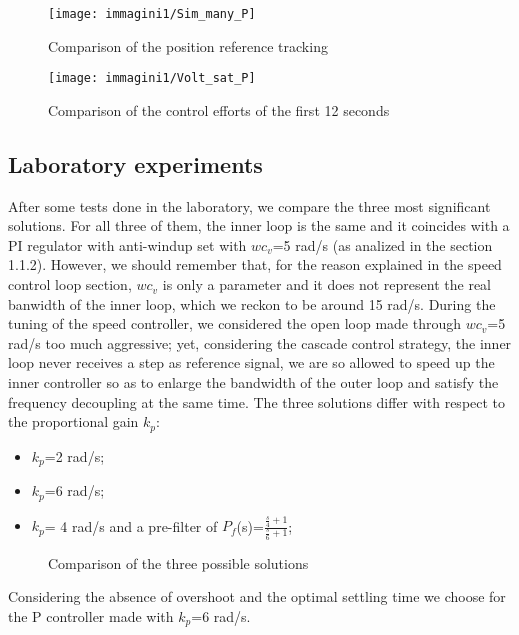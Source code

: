 \begin{figure}[h]
	\centering
	\texttt{[image: immagini1/Sim\_many\_P]}
	\caption{Comparison of the position reference tracking}
	\label{fig:Pos_ref_comparison}
\end{figure}
\begin{figure}[h]
	\centering
	\texttt{[image: immagini1/Volt\_sat\_P]}
	\caption{Comparison of the control efforts of the first 12 seconds}
	\label{fig:Volt_sat_comparison}
\end{figure}

\subsection{Laboratory experiments}
After some tests done in the laboratory, we compare the three most significant solutions. For all three of them, the inner loop is the same and it coincides with a PI regulator with anti-windup set with $wc_{v}$=5 rad/s (as analized in the section 1.1.2). However, we should remember that, for the reason explained in the speed control loop section, $wc_{v}$ is only a parameter and it does not represent the real banwidth of the inner loop, which we reckon to be around 15 rad/s.
During the tuning of the speed controller, we considered the open loop made through $wc_{v}$=5 rad/s too much aggressive; yet, considering the cascade control strategy, the inner loop never receives a step as reference signal, we are so allowed to speed up the inner controller so as to enlarge the bandwidth of the outer loop and satisfy the frequency decoupling at the same time.
The three solutions differ with respect to the proportional gain $k_{p}$:
\begin{itemize}
	\item $k_{p}$=2 rad/s;
	\item $k_{p}$=6 rad/s;
	\item $k_{p}$= 4 rad/s and a pre-filter of $P_{f}$(s)=$\frac{\frac{s}{4}+1}{\frac{s}{6}+1}$;
\end{itemize}

\begin{figure}[h]
	\centering
	 \quad
	\caption{Comparison of the three possible solutions}
	\label{fig:Comparison_P_LAB}
\end{figure}

\par 
Considering the absence of overshoot and the optimal settling time we choose for the P controller made with $k_{p}$=6 rad/s.

